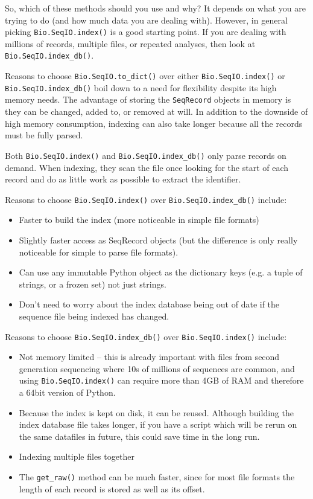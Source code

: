 \documentclass{report}
\begin{document}
So, which of these methods should you use and why? It depends on what you are
trying to do (and how much data you are dealing with). However, in general
picking \verb|Bio.SeqIO.index()| is a good starting point. If you are dealing
with millions of records, multiple files, or repeated analyses, then look at
\verb|Bio.SeqIO.index_db()|.

Reasons to choose \verb|Bio.SeqIO.to_dict()| over either
\verb|Bio.SeqIO.index()| or \verb|Bio.SeqIO.index_db()| boil down to a need
for flexibility despite its high memory needs. The advantage of storing the
\verb|SeqRecord| objects in memory is they can be changed, added to, or
removed at will. In addition to the downside of high memory consumption,
indexing can also take longer because all the records must be fully parsed.

Both \verb|Bio.SeqIO.index()| and \verb|Bio.SeqIO.index_db()| only parse
records on demand. When indexing, they scan the file once looking for the
start of each record and do as little work as possible to extract the
identifier.

Reasons to choose \verb|Bio.SeqIO.index()| over \verb|Bio.SeqIO.index_db()|
include:
\begin{itemize}
\item Faster to build the index (more noticeable in simple file formats)
\item Slightly faster access as SeqRecord objects (but the difference is only
really noticeable for simple to parse file formats).
\item Can use any immutable Python object as the dictionary keys (e.g. a
tuple of strings, or a frozen set) not just strings.
\item Don't need to worry about the index database being out of date if the
sequence file being indexed has changed.
\end{itemize}

Reasons to choose \verb|Bio.SeqIO.index_db()| over \verb|Bio.SeqIO.index()|
include:
\begin{itemize}
\item Not memory limited -- this is already important with files from second
generation sequencing where 10s of millions of sequences are common, and
using \verb|Bio.SeqIO.index()| can require more than 4GB of RAM and therefore
a 64bit version of Python.
\item Because the index is kept on disk, it can be reused. Although building
the index database file takes longer, if you have a script which will be
rerun on the same datafiles in future, this could save time in the long run.
\item Indexing multiple files together
\item The \verb|get_raw()| method can be much faster, since for most file
formats the length of each record is stored as well as its offset.
\end{itemize}
\end{document}
